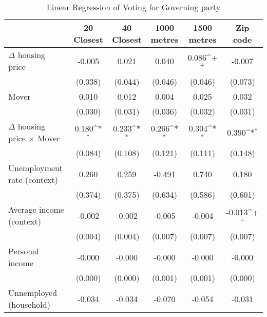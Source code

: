 \begin{table}[htbp]\centering
\def\sym#1{\ifmmode^{#1}\else\(^{#1}\)\fi}
\caption{Linear Regression of Voting for Governing party } \footnotesize \label{tabmovers}
\begin{tabular}{l*{5}{c}}
\hline\hline
                    &\multicolumn{1}{c}{20 Closest}&\multicolumn{1}{c}{40 Closest}&\multicolumn{1}{c}{1000 metres}&\multicolumn{1}{c}{1500 metres}&\multicolumn{1}{c}{Zip code}\\
\hline
$\Delta$ housing price&      -0.005       &       0.021       &       0.040       &       0.086\sym{+}&      -0.007       \\
                    &     (0.038)       &     (0.044)       &     (0.046)       &     (0.046)       &     (0.073)       \\
[1em]
Mover               &       0.010       &       0.012       &       0.004       &       0.025       &       0.032       \\
                    &     (0.030)       &     (0.031)       &     (0.036)       &     (0.032)       &     (0.031)       \\
[1em]
$\Delta$ housing price $\times$ Mover&       0.180\sym{*}&       0.233\sym{*}&       0.266\sym{*}&       0.304\sym{*}&       0.390\sym{*}\\
                    &     (0.084)       &     (0.108)       &     (0.121)       &     (0.111)       &     (0.148)       \\
[1em]
Unemployment rate (context)&       0.260       &       0.259       &      -0.491       &       0.740       &       0.180       \\
                    &     (0.374)       &     (0.375)       &     (0.634)       &     (0.586)       &     (0.601)       \\
[1em]
Average income (context)&      -0.002       &      -0.002       &      -0.005       &      -0.004       &      -0.013\sym{+}\\
                    &     (0.004)       &     (0.004)       &     (0.007)       &     (0.007)       &     (0.007)       \\
[1em]
Personal income     &      -0.000       &      -0.000       &      -0.000       &      -0.000       &      -0.000       \\
                    &     (0.000)       &     (0.000)       &     (0.001)       &     (0.001)       &     (0.000)       \\
[1em]
Unnemployed (household)&      -0.034       &      -0.034       &      -0.070       &      -0.054       &      -0.031       \\

\end{tabular}
\end{table}
